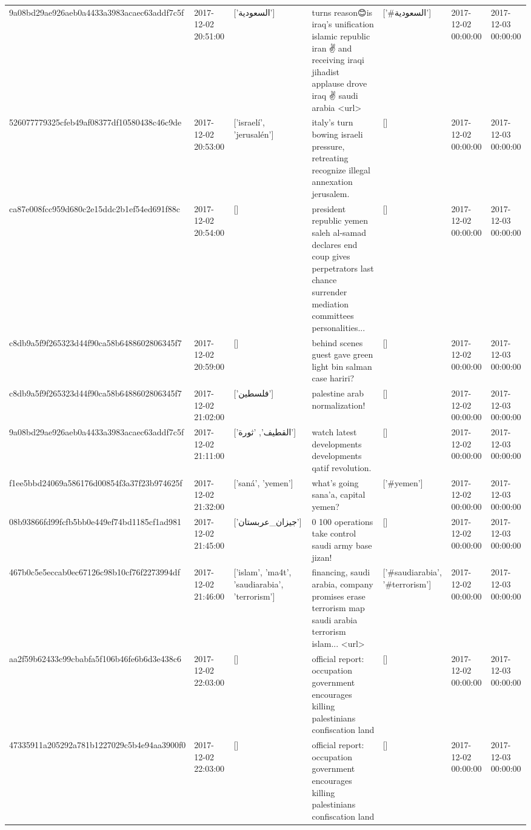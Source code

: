 \begin{tabular}{lllllll}
9a08bd29ae926aeb0a4433a3983acaec63addf7c5f & 2017-12-02 20:51:00 & ['السعودية'] & turns reason😊is iraq's unification islamic republic iran💙✌💙and receiving iraqi jihadist applause drove iraq ✌ saudi arabia <url> & ['#السعودية'] & 2017-12-02 00:00:00 & 2017-12-03 00:00:00 \\
526077779325cfeb49af08377df10580438c46c9de & 2017-12-02 20:53:00 & ['israelí', 'jerusalén'] & italy's turn bowing israeli pressure, retreating recognize illegal annexation jerusalem. & [] & 2017-12-02 00:00:00 & 2017-12-03 00:00:00 \\
ca87e008fcc959d680c2e15ddc2b1ef54ed691f88c & 2017-12-02 20:54:00 & [] & president republic yemen saleh al-samad declares end coup gives perpetrators last chance surrender mediation committees personalities... & [] & 2017-12-02 00:00:00 & 2017-12-03 00:00:00 \\
c8db9a5f9f265323d44f90ca58b6488602806345f7 & 2017-12-02 20:59:00 & [] & behind scenes guest gave green light bin salman case hariri? & [] & 2017-12-02 00:00:00 & 2017-12-03 00:00:00 \\
c8db9a5f9f265323d44f90ca58b6488602806345f7 & 2017-12-02 21:02:00 & ['فلسطين'] & palestine arab normalization! & [] & 2017-12-02 00:00:00 & 2017-12-03 00:00:00 \\
9a08bd29ae926aeb0a4433a3983acaec63addf7c5f & 2017-12-02 21:11:00 & ['القطيف', 'ثورة'] & watch latest developments developments qatif revolution. & [] & 2017-12-02 00:00:00 & 2017-12-03 00:00:00 \\
f1ee5bbd24069a586176d00854f3a37f23b974625f & 2017-12-02 21:32:00 & ['saná', 'yemen'] & what's going sana'a, capital yemen? & ['#yemen'] & 2017-12-02 00:00:00 & 2017-12-03 00:00:00 \\
08b93866fd99fcfb5bb0e449ef74bd1185cf1ad981 & 2017-12-02 21:45:00 & ['جیزان_عربستان'] & 0 100 operations take control saudi army base jizan! & [] & 2017-12-02 00:00:00 & 2017-12-03 00:00:00 \\
467b0c5e5eccab0ec67126c98b10cf76f2273994df & 2017-12-02 21:46:00 & ['islam', 'ma4t', 'saudiarabia', 'terrorism'] & financing, saudi arabia, company promises erase terrorism map saudi arabia terrorism islam... <url> & ['#saudiarabia', '#terrorism'] & 2017-12-02 00:00:00 & 2017-12-03 00:00:00 \\
aa2f59b62433c99cbabfa5f106b46fe6b6d3e438c6 & 2017-12-02 22:03:00 & [] & official report: occupation government encourages killing palestinians confiscation land & [] & 2017-12-02 00:00:00 & 2017-12-03 00:00:00 \\
47335911a205292a781b1227029c5b4e94aa3900f0 & 2017-12-02 22:03:00 & [] & official report: occupation government encourages killing palestinians confiscation land & [] & 2017-12-02 00:00:00 & 2017-12-03 00:00:00 \\

\end{tabular}
